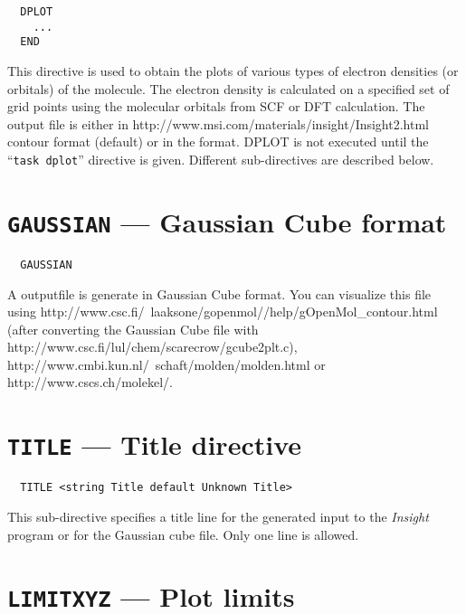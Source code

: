 %
%
\label{sec:dplot}
\begin{verbatim}
  DPLOT
    ...
  END
\end{verbatim}

This directive is used to obtain the plots of various types of electron
densities (or orbitals) of the molecule. The electron density is calculated
on a specified set of grid points using the molecular orbitals
from SCF or DFT calculation. The output file is either in 
{http://www.msi.com/materials/insight/Insight2.html} contour format
(default)
 or in the 
format.  DPLOT is not executed until the ``\verb+task dplot+'' directive is given.  
Different sub-directives are described below.

\section{{\tt GAUSSIAN} --- Gaussian Cube format}

\begin{verbatim}
  GAUSSIAN
\end{verbatim}

A outputfile is generate in Gaussian Cube format.
You can visualize this file using  
{http://www.csc.fi/~laaksone/gopenmol//help/gOpenMol_contour.html}
(after converting the Gaussian Cube file with 
{http://www.csc.fi/lul/chem/scarecrow/gcube2plt.c}),
{http://www.cmbi.kun.nl/~schaft/molden/molden.html} 
 or 
{http://www.cscs.ch/molekel/}.

\section{{\tt TITLE} --- Title directive}

\begin{verbatim}
  TITLE <string Title default Unknown Title>
\end{verbatim}

This sub-directive specifies a title line for the generated
input to the {\em Insight} program or for the Gaussian cube
file. Only one line is allowed.

\section{{\tt LIMITXYZ} --- Plot limits}

